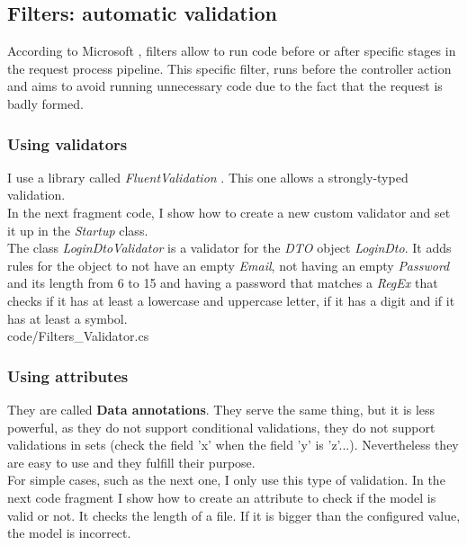    \subsection{Filters: automatic validation}
        According to Microsoft \cite{Filters}, filters allow to run code before or after specific stages in the request process pipeline. This specific filter, runs before the controller action and aims to avoid running unnecessary code due to the fact that the request is badly formed. \\

        \subsubsection{Using validators}
            I use a library called \textit{FluentValidation} \cite{FluentValidation}. This one allows a strongly-typed validation. \\

            In the next fragment code, I show how to create a new custom validator and set it up in the \textit{Startup} class. \\
            The class \textit{LoginDtoValidator} is a validator for the \textit{DTO} object \textit{LoginDto}. It adds rules for the object to not have an empty \textit{Email}, not having an empty \textit{Password} and its length from 6 to 15 and having a password that matches a \textit{RegEx} that checks if it has at least a lowercase and uppercase letter, if it has a digit and if it has at least a symbol. \\

            
            {code/Filters_Validator.cs}

        \subsubsection{Using attributes}
            They are called \textbf{Data annotations}. They serve the same thing, but it is less powerful, as they do not support conditional validations, they do not support validations in sets (check the field 'x' when the field 'y' is 'z'...). Nevertheless they are easy to use and they fulfill their purpose. \\
            For simple cases, such as the next one, I only use this type of validation. In the next code fragment I show how to create an attribute to check if the model is valid or not. It checks the length of a file. If it is bigger than the configured value, the model is incorrect.

